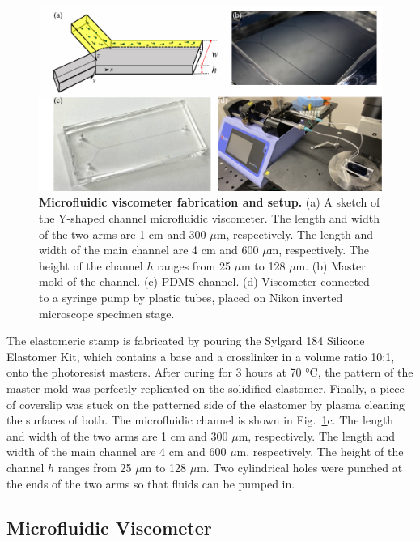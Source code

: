 \begin{figure}[!ht]
	\begin{center}
	\includegraphics[width=5.5 in]{Figs/2-Exp/7.pdf}
	\end{center}
	\caption[Microfluidic Viscometer Fabrication and Setup.]
	{
	\textbf{Microfluidic viscometer fabrication and setup.}
	(a) A sketch of the Y-shaped channel microfluidic viscometer. The length and width of the two arms are 1 cm and 300 $\mu$m, respectively. The length and width of the main channel are 4 cm and 600 $\mu$m, respectively. The height of the channel $h$ ranges from 25 $\mu$m to 128 $\mu$m.
	(b) Master mold of the channel.
	(c) PDMS channel.
	(d) Viscometer connected to a syringe pump by plastic tubes, placed on Nikon inverted microscope specimen stage.
	}
	\label{fig:experiment-microfluidics}
\end{figure}

The elastomeric stamp is fabricated by pouring the Sylgard 184 Silicone Elastomer Kit, which contains a base and a crosslinker in a volume ratio 10:1, onto the photoresist masters. After curing for 3 hours at 70 °C, the pattern of the master mold was perfectly replicated on the solidified elastomer. Finally, a piece of coverslip was stuck on the patterned side of the elastomer by plasma cleaning the surfaces of both. The microfluidic channel is shown in Fig.~\ref{fig:experiment-microfluidics}c. The length and width of the two arms are 1 cm and 300 $\mu$m, respectively. The length and width of the main channel are 4 cm and 600 $\mu$m, respectively. The height of the channel $h$ ranges from 25 $\mu$m to 128 $\mu$m. Two cylindrical holes were punched at the ends of the two arms so that fluids can be pumped in.

\subsection{Microfluidic Viscometer}


